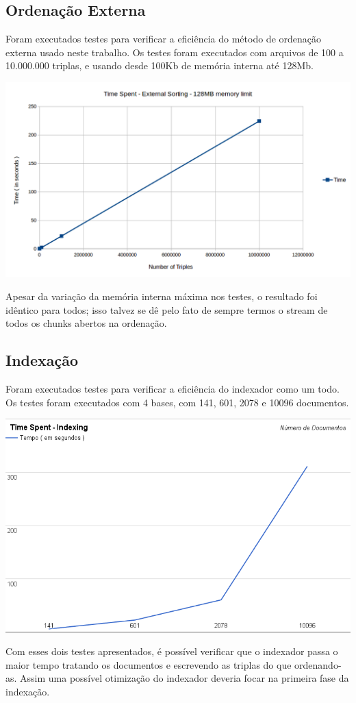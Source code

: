 \documentclass[11pt]{article}
\begin{document}
\subsection{Ordenação Externa}

Foram executados testes para verificar a eficiência do método de ordenação externa usado neste trabalho. Os testes foram executados com arquivos de 100 a 10.000.000 triplas, e usando desde 100Kb de memória interna até 128Mb.

\begin{center}
\includegraphics[scale=0.55]{ExternalSortingEfficiency.png}
\end{center}

Apesar da variação da memória interna máxima nos testes, o resultado foi idêntico para todos; isso talvez se dê pelo fato de sempre termos o stream de todos os chunks abertos na ordenação.

\subsection{Indexação}

Foram executados testes para verificar a eficiência do indexador como um todo. Os testes foram executados com 4 bases, com 141, 601, 2078 e 10096 documentos.

\begin{center}
\includegraphics[scale=0.55]{IndexingEfficiency.png}
\end{center}

Com esses dois testes apresentados, é possível verificar que o indexador passa o maior tempo tratando os documentos e escrevendo as triplas do que ordenando-as. Assim uma possível otimização do indexador deveria focar na primeira fase da indexação.
\end{document}
